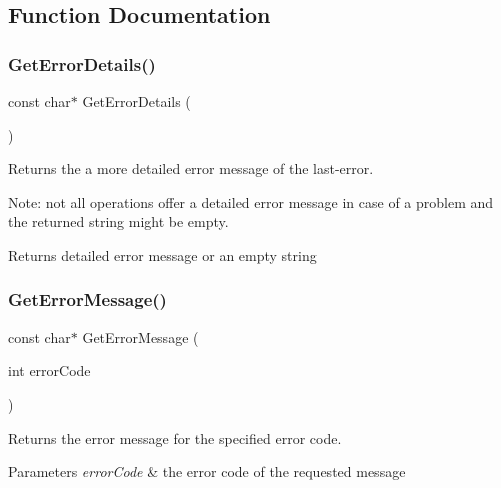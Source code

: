 \subsection{Function Documentation}
\mbox{\label{group__error__group_ga8258f5044a56ed71aeed5633fc8341b6}} 
\subsubsection{\texorpdfstring{Get\+Error\+Details()}{GetErrorDetails()}}
{\footnotesize\ttfamily const char$\ast$ Get\+Error\+Details (\begin{DoxyParamCaption}{ }\end{DoxyParamCaption})}

Returns the a more detailed error message of the last-\/error.

Note\+: not all operations offer a detailed error message in case of a problem and the returned string might be empty.

\begin{DoxyReturn}{Returns}
detailed error message or an empty string 
\end{DoxyReturn}
\mbox{\label{group__error__group_gac785e42215658e0f7127f3690dd8f788}} 
\subsubsection{\texorpdfstring{Get\+Error\+Message()}{GetErrorMessage()}}
{\footnotesize\ttfamily const char$\ast$ Get\+Error\+Message (\begin{DoxyParamCaption}\item[{int}]{error\+Code }\end{DoxyParamCaption})}

Returns the error message for the specified error code.


\begin{DoxyParams}{Parameters}
{\em error\+Code} & the error code of the requested message \\
\hline
\end{DoxyParams}
\mbox{\label{group__error__group_ga10b9a284527af83a44533867b0aff0fc}} 
